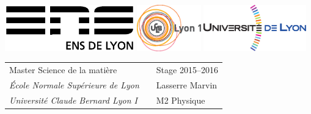 \documentclass[11pt,a4paper]{article}
\begin{document}
\setlength{\parindent}{0pt}

\thispagestyle{empty}

\includegraphics[height=2cm]{logos/logoens.eps} \hfill \includegraphics[height=2cm]{logos/logoucbl.eps} \hfill \includegraphics[height=2cm]{logos/logounivlyon.eps}

\vspace{0.5cm}

\begin{tabularx}{\textwidth}{@{} l X l @{} }
{\sc Master Science de la matière} & & Stage 2015--2016 \\
{\it École Normale Supérieure de Lyon} & & Lasserre Marvin \\
{\it Université Claude Bernard Lyon I} & & M2 Physique
\end{tabularx}
\end{document}
